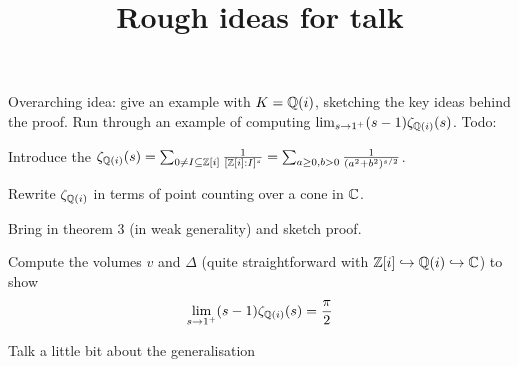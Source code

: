 \documentclass[11pt]{article}
\title{Rough ideas for talk}
\begin{document}
\maketitle


Overarching idea: give an example with $K = \mathbb{Q}(i)$, sketching the key ideas behind the proof. Run through an example of computing $\lim_{s \to 1^+} (s - 1)\zeta_{\mathbb{Q}(i)}(s)$. Todo:
\begin{enum}
    \item Introduce the $\zeta_{\mathbb{Q}(i)}(s) = \sum_{0 \neq I \subseteq \mathbb{Z}[i]}\frac1{[\mathbb{Z}[i] : I]^s} = \sum_{a \geq 0, b > 0}\frac1{(a^2 + b^2)^{s/2}}$.
    \item Rewrite $\zeta_{\mathbb{Q}(i)}$ in terms of point counting over a cone in $\mathbb{C}$.
    \item Bring in theorem 3 (in weak generality) and sketch proof.
    \item Compute the volumes $v$ and $\Delta$ (quite straightforward with $\mathbb{Z}[i] \hookrightarrow \mathbb{Q}(i) \hookrightarrow \mathbb{C}$) to show 
    $$
        \lim_{s \to 1^+}(s - 1)\zeta_{\mathbb{Q}(i)}(s) = \frac\pi2
    $$
    \item Talk a little bit about the generalisation
\end{enum}
\end{document}
